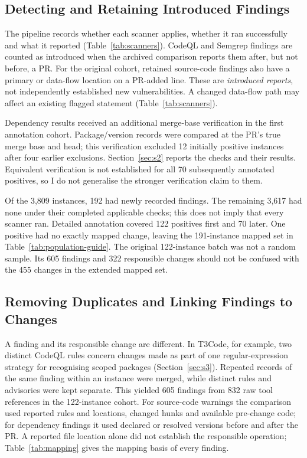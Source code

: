 \documentclass[acmsmall,screen,nonacm]{acmart}
\begin{document}
\subsection{Detecting and Retaining Introduced Findings}

The pipeline records whether each scanner applies, whether it ran successfully and what it reported (Table~\ref{tab:scanners}). CodeQL and Semgrep findings are counted as introduced when the archived comparison reports them after, but not before, a PR. For the original cohort, retained source-code findings also have a primary or data-flow location on a PR-added line. These are \emph{introduced reports}, not independently established new vulnerabilities. A changed data-flow path may affect an existing flagged statement (Table~\ref{tab:scanners}).

Dependency results received an additional merge-base verification in the first annotation cohort. Package/version records were compared at the PR's true merge base and head; this verification excluded 12 initially positive instances after four earlier exclusions. Section~\ref{sec:s2} reports the checks and their results. Equivalent verification is not established for all 70 subsequently annotated positives, so I do not generalise the stronger verification claim to them.

Of the 3,809 instances, 192 had newly recorded findings. The remaining 3,617 had none under their completed applicable checks; this does not imply that every scanner ran. Detailed annotation covered 122 positives first and 70 later. One positive had no exactly mapped change, leaving the 191-instance mapped set in Table~\ref{tab:population-guide}. The original 122-instance batch was not a random sample. Its 605 findings and 322 responsible changes should not be confused with the 455 changes in the extended mapped set.

\subsection{Removing Duplicates and Linking Findings to Changes}\label{sec:attrib}

A finding and its responsible change are different. In T3Code, for example, two distinct CodeQL rules concern changes made as part of one regular-expression strategy for recognising scoped packages (Section~\ref{sec:s3}). Repeated records of the same finding within an instance were merged, while distinct rules and advisories were kept separate. This yielded 605 findings from 832 raw tool references in the 122-instance cohort. For source-code warnings the comparison used reported rules and locations, changed hunks and available pre-change code; for dependency findings it used declared or resolved versions before and after the PR. A reported file location alone did not establish the responsible operation; Table~\ref{tab:mapping} gives the mapping basis of every finding.
\end{document}
